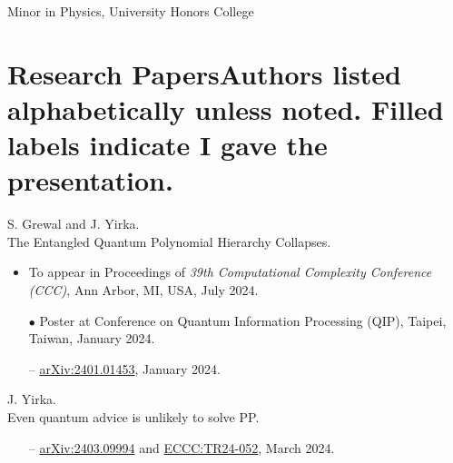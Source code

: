 \documentclass[11pt,letterpaper,serif]{moderncv}
\newcommand{\pubItemSep}{0em}
\begin{document}
\vspace{-\parsep}
{%
}
{
	\begin{adjustwidth}{.25in}{}
		Minor in Physics, University Honors College
	\end{adjustwidth}
}

\section{Research Papers\hfill{\footnotesize \normalfont Authors listed alphabetically unless noted. Filled labels indicate I gave the presentation.}}

S. Grewal and J. Yirka.
\\The Entangled Quantum Polynomial Hierarchy Collapses.
\begin{adjustwidth}{.1in}{}
	\begin{itemize}[itemsep=\pubItemSep]
		\item To appear in Proceedings of \textit{39th Computational Complexity Conference (CCC)}, Ann Arbor, MI, USA, July 2024.
		\item[$\bullet$] Poster at Conference on Quantum Information Processing (QIP), Taipei, Taiwan, January 2024.
		\item[--] \href{https://arxiv.org/abs/2401.01453}{arXiv:2401.01453}, January 2024.
	\end{itemize}
\end{adjustwidth}
\vspace{\parsep}

J. Yirka.
\\Even quantum advice is unlikely to solve \textup{PP}.
\begin{adjustwidth}{.1in}{}
	\begin{itemize}[itemsep=\pubItemSep]
		\item[--] \href{https://arxiv.org/abs/2403.09994}{arXiv:2403.09994} and \href{https://eccc.weizmann.ac.il/report/2024/052/}{ECCC:TR24-052}, March 2024.
	\end{itemize}
\end{adjustwidth}
\vspace{\parsep}
\end{document}
